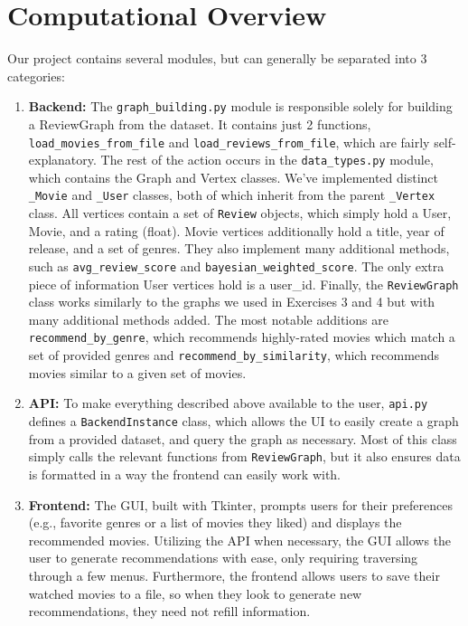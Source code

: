 \documentclass[12pt]{article}
\begin{document}
\section{Computational Overview}
Our project contains several modules, but can generally be separated into 3 categories:
\begin{enumerate}
    \item \textbf{Backend:} The \texttt{graph\_building.py} module is responsible solely for building a ReviewGraph from the dataset. It contains just 2 functions, \texttt{load\_movies\_from\_file} and \texttt{load\_reviews\_from\_file}, which are fairly self-explanatory. The rest of the action occurs in the \texttt{data\_types.py} module, which contains the Graph and Vertex classes. We've implemented distinct \texttt{\_Movie} and \texttt{\_User} classes, both of which inherit from the parent \texttt{\_Vertex} class. All vertices contain a set of \texttt{Review} objects, which simply hold a User, Movie, and a rating (float). Movie vertices additionally hold a title, year of release, and a set of genres. They also implement many additional methods, such as \texttt{avg\_review\_score} and  \texttt{bayesian\_weighted\_score}. The only extra piece of information User vertices hold is a user\_id. Finally, the \texttt{ReviewGraph} class works similarly to the graphs we used in Exercises 3 and 4 but with many additional methods added. The most notable additions are \texttt{recommend\_by\_genre}, which recommends highly-rated movies which match a set of provided genres and \texttt{recommend\_by\_similarity}, which recommends movies similar to a given set of movies.
    \item \textbf{API:} To make everything described above available to the user, \texttt{api.py} defines a \texttt{BackendInstance} class, which allows the UI to easily create a graph from a provided dataset, and query the graph as necessary. Most of this class simply calls the relevant functions from \texttt{ReviewGraph}, but it also ensures data is formatted in a way the frontend can easily work with.
    \item \textbf{Frontend:} The GUI, built with Tkinter, prompts users for their preferences (e.g., favorite genres or a list of movies they liked) and displays the recommended movies. Utilizing the API when necessary, the GUI allows the user to generate recommendations with ease, only requiring traversing through a few menus. Furthermore, the frontend allows users to save their watched movies to a file, so when they look to generate new recommendations, they need not refill information.
\end{enumerate}
\end{document}
